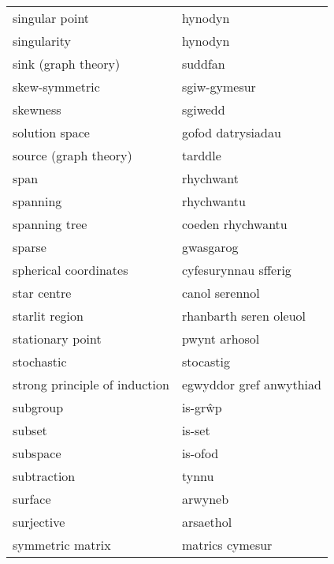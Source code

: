 \begin{supertabular}{p{0.22\textwidth}p{0.22\textwidth}}
                  singular point &                         hynodyn \\
                     singularity &                         hynodyn \\
             sink (graph theory) &                         suddfan \\
                  skew-symmetric &                    sgiw-gymesur \\
                        skewness &                         sgiwedd \\
                  solution space &               gofod datrysiadau \\
           source (graph theory) &                         tarddle \\
                            span &                       rhychwant \\
                        spanning &                      rhychwantu \\
                   spanning tree &               coeden rhychwantu \\
                          sparse &                       gwasgarog \\
           spherical coordinates &            cyfesurynnau sfferig \\
                     star centre &                  canol serennol \\
                  starlit region &          rhanbarth seren oleuol \\
                stationary point &                   pwynt arhosol \\
                      stochastic &                       stocastig \\
   strong principle of induction &         egwyddor gref anwythiad \\
                        subgroup &                         is-grŵp \\
                          subset &                          is-set \\
                        subspace &                         is-ofod \\
                     subtraction &                           tynnu \\
                         surface &                         arwyneb \\
                      surjective &                       arsaethol \\
                symmetric matrix &                 matrics cymesur \\

\end{supertabular}
